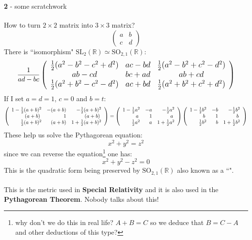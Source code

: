 \documentclass[12pt]{article}
\begin{document}
 \newpage
 
\noindent \textbf{2} - some scratchwork \\ \\
How to turn $2 \times 2$ matrix into $3 \times 3$ matrix?
$$ 
\left(
\begin{array}{cc}
a & b \\ c & d
\end{array}
 \right)
$$
There is ``isomorphism" $\mathrm{SL}_2(\mathbb{R})\simeq \mathrm{SO}_{2,1}(\mathbb{R})$:
$$ \large \frac{1}{ad-bc} 
\left(
\begin{array}{ccc}
\frac{1}{2}(a^2 - b^2 - c^2 + d^2)
& ac-bd & \frac{1}{2}(a^2 - b^2 + c^2 - d^2) \\
ab-cd & bc+ad & ab + cd \\
\frac{1}{2}(a^2 + b^2 - c^2 - d^2)
& ac+bd &
\frac{1}{2}(a^2 + b^2 + c^2 + d^2)
\end{array}
 \right)
$$
If I set $a = d = 1$, $c=0$ and $b = t$:
$$  \normalsize
\left(
\begin{array}{rrr}
1 - \frac{1}{2} (a+b)^2  
&-(a+b) &- \frac{1}{2} (a+b)^2   \\
(a+b) \; & 1 & (a+b) \; \\
\frac{1}{2} (a+b)^2  
& (a+b) &
1+\frac{1}{2}(a+b)^2 
\end{array}
 \right)
=
\left(
\begin{array}{rrr}
1 - \frac{1}{2} a^2  
&-a &- \frac{1}{2} a^2   \\
a \; & 1 & a \; \\
\frac{1}{2} a^2  
& a &
1+\frac{1}{2}a^2 
\end{array}
 \right)
\left(
\begin{array}{rrr}
1 - \frac{1}{2} b^2  
&-b &- \frac{1}{2} b^2   \\
b \; & 1 & b \; \\
\frac{1}{2} b^2  
& b &
1+\frac{1}{2}b^2 
\end{array}
 \right)
$$
These help us solve the Pythagorean equation:
$$ x^2 + y^2 = z^2 $$
since we can reverse the equation\footnote{why don't we do this in real life?  $A+B=C$ so we deduce that $B = C - A$ and other deductions of this type?} one has:
$$ x^2 + y^2 - z^2 = 0 $$
This is the quadratic form being preserved by $\mathrm{SO}_{2,1}(\mathbb{R})$ also known as a ``\textbf{\color{blue!50!white}{spinor}}".  \\ \\
This is the metric used in \textbf{Special Relativity} and it is also used in the \textbf{Pythagorean Theorem}.  Nobody talks about this! \newpage
\end{document}
